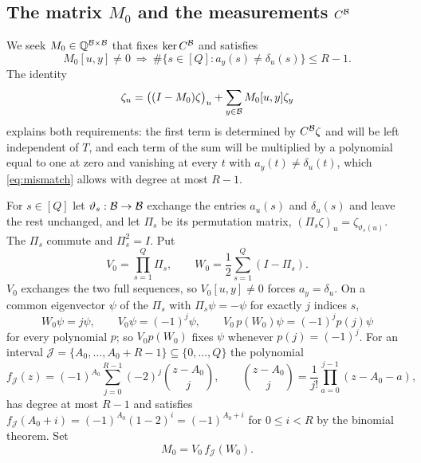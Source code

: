 \subsection{The matrix $M_0$ and the measurements $C^{\mathcal{B}}$}
We seek $M_0\in\mathbb{Q}^{\mathcal{B}\times\mathcal{B}}$ that fixes $\ker C^{\mathcal{B}}$ and satisfies
\begin{equation}\label{eq:mismatch}
  M_0[u,y]\ne0\ \Longrightarrow\ \#\{s\in[Q]:a_y(s)\ne\delta_u(s)\}\le R-1 .
\end{equation}
The identity
\begin{equation}\label{eq:split}
  \zeta_u=\bigl((I-M_0)\zeta\bigr)_u+\sum_{y\in\mathcal{B}}M_0[u,y]\zeta_y
\end{equation}
explains both requirements: the first term is determined by $C^{\mathcal{B}}\zeta$ and
will be left independent of $T$, and each term of the sum will be multiplied by a
polynomial equal to one at zero and vanishing at every $t$ with
$a_y(t)\ne\delta_u(t)$, which \eqref{eq:mismatch} allows with degree at most
$R-1$.

For $s\in[Q]$ let $\vartheta_s:\mathcal{B}\to\mathcal{B}$ exchange the entries $a_u(s)$ and
$\delta_u(s)$ and leave the rest unchanged, and let $\Pi_s$ be its permutation
matrix, $(\Pi_s\zeta)_u=\zeta_{\vartheta_s(u)}$. The $\Pi_s$ commute and
$\Pi_s^2=I$. Put
\begin{equation}\label{eq:V0W0}
  V_0=\prod_{s=1}^{Q}\Pi_s,\qquad W_0=\frac12\sum_{s=1}^{Q}(I-\Pi_s).
\end{equation}
$V_0$ exchanges the two full sequences, so $V_0[u,y]\ne0$ forces $a_y=\delta_u$.
On a common eigenvector $\psi$ of the $\Pi_s$ with $\Pi_s\psi=-\psi$ for exactly
$j$ indices $s$,
\begin{equation}\label{eq:eigen}
  W_0\psi=j\psi,\qquad V_0\psi=(-1)^j\psi,\qquad V_0\,p(W_0)\psi=(-1)^jp(j)\psi
\end{equation}
for every polynomial $p$; so $V_0p(W_0)$ fixes $\psi$ whenever $p(j)=(-1)^j$.
For an interval $\mathcal J=\{A_0,\dots,A_0+R-1\}\subseteq\{0,\dots,Q\}$ the
polynomial
\begin{equation}\label{eq:fI}
  f_{\mathcal J}(z)=(-1)^{A_0}\sum_{j=0}^{R-1}(-2)^j\binom{z-A_0}{j},\qquad
  \binom{z-A_0}{j}=\frac1{j!}\prod_{a=0}^{j-1}(z-A_0-a),
\end{equation}
has degree at most $R-1$ and satisfies $f_{\mathcal J}(A_0+i)=(-1)^{A_0}(1-2)^i=(-1)^{A_0+i}$
for $0\le i<R$ by the binomial theorem. Set
\begin{equation}\label{eq:M0}
  M_0=V_0\,f_{\mathcal J}(W_0).
\end{equation}

